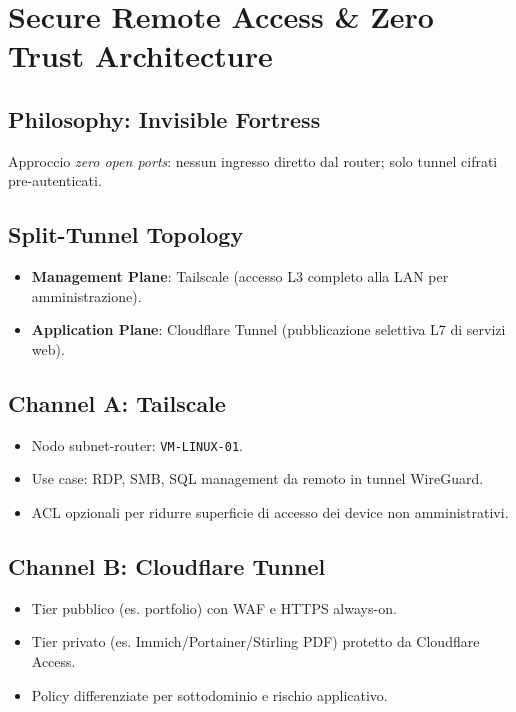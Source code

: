 \documentclass[11pt,a4paper]{article}
\begin{document}
\section{Secure Remote Access \& Zero Trust Architecture}

\subsection{Philosophy: Invisible Fortress}
Approccio \textit{zero open ports}: nessun ingresso diretto dal router; solo tunnel cifrati pre-autenticati.

\subsection{Split-Tunnel Topology}
\begin{itemize}
  \item \textbf{Management Plane}: Tailscale (accesso L3 completo alla LAN per amministrazione).
  \item \textbf{Application Plane}: Cloudflare Tunnel (pubblicazione selettiva L7 di servizi web).
\end{itemize}

\subsection{Channel A: Tailscale}
\begin{itemize}
  \item Nodo subnet-router: \texttt{VM-LINUX-01}.
  \item Use case: RDP, SMB, SQL management da remoto in tunnel WireGuard.
  \item ACL opzionali per ridurre superficie di accesso dei device non amministrativi.
\end{itemize}

\subsection{Channel B: Cloudflare Tunnel}
\begin{itemize}
  \item Tier pubblico (es. portfolio) con WAF e HTTPS always-on.
  \item Tier privato (es. Immich/Portainer/Stirling PDF) protetto da Cloudflare Access.
  \item Policy differenziate per sottodominio e rischio applicativo.
\end{itemize}
\end{document}
